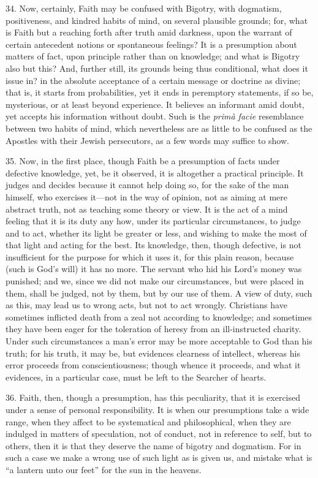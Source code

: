 34. Now, certainly, Faith may be confused with Bigotry, with
dogmatism, positiveness, and kindred habits of mind, on several
plausible grounds; for, what is Faith but a reaching forth after truth
amid darkness, upon the warrant of certain antecedent notions or
spontaneous feelings? It is a presumption about matters of fact, upon
principle rather than on knowledge; and what is Bigotry also but this?
And, further still, its grounds being thus conditional, what does it
issue in? in the absolute acceptance of a certain message or doctrine
as divine; that is, it starts from probabilities, yet it ends in
peremptory statements, if so be, mysterious, or at least beyond
experience. It believes an informant amid doubt, yet accepts his
information without doubt. Such is the \emph{primà facie} resemblance
between two habits of mind, which nevertheless are as little to be
confused as the Apostles with their Jewish persecutors, as a few words
may suffice to show.

35. Now, in the first place, though Faith be a presumption of facts
under defective knowledge, yet, be it observed, it is altogether a
practical principle. It judges and decides because it cannot help
doing so, for the sake of the man himself, who exercises it—not in
the way of opinion, not as aiming at mere abstract truth, not as
teaching some theory or view. It is the act of a mind feeling that it
is its duty any how, under its particular circumstances, to judge and
to act, whether its light be greater or less, and wishing to make the
most of that light and acting for the best. Its knowledge, then,
though defective, is not insufficient for the purpose for which it
uses it, for this plain reason, because (such is God's will) it has no
more. The servant who hid his Lord's money was punished; and we, since
we did not make our circumstances, but were placed in them, shall be
judged, not by them, but by our use of them. A view of duty, such as
this, may lead us to wrong acts, but not to act wrongly. Christians
have sometimes inflicted death from a zeal not according to knowledge;
and sometimes they have been eager for the toleration of heresy from
an ill-instructed charity. Under such circumstances a man's error may
be more acceptable to God than his truth; for his truth, it may be,
but evidences clearness of intellect, whereas his error proceeds from
conscientiousness; though whence it proceeds, and what it evidences,
in a particular case, must be left to the Searcher of hearts.

36. Faith, then, though a presumption, has this peculiarity, that
it is exercised under a sense of personal responsibility. It is when
our presumptions take a wide range, when they affect to be
systematical and philosophical, when they are indulged in matters of
speculation, not of conduct, not in reference to self, but to others,
then it is that they deserve the name of bigotry and dogmatism. For in
such a case we make a wrong use of such light as is given us, and
mistake what is ``a lantern unto our feet'' for the sun in the
heavens.

